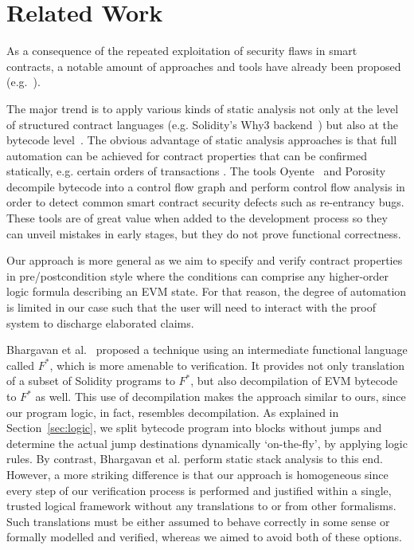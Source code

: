 \documentclass[sigplan,10pt]{acmart}\settopmatter{printfolios=true,printccs=false,printacmref=false}
\begin{document}
\section{Related Work}
\label{sec:rwork}
%
As a consequence of the repeated exploitation of security flaws in smart contracts,
a notable amount of approaches and tools have already been proposed (e.g.~\cite{Bhargavan:2016:FVS:2993600.2993611,securify,Luu_COSH_16}).
 
The major trend is to apply various kinds of static analysis not only at the level of structured contract
languages (e.g. Solidity's Why3 backend~\cite{filliatre2013why3,Reitwiessner_16}) but also at the bytecode level~\cite{Msuiche_17,securify,Luu_COSH_16}. 
%
The obvious advantage of static analysis approaches is that full automation can be achieved for 
contract properties that can be confirmed statically, e.g. certain orders of transactions \cite{securify}.
The tools Oyente~\cite{Luu_COSH_16} and Porosity~\cite{Msuiche_17} decompile
bytecode into a control flow graph and perform control flow analysis in order
to detect common smart contract security defects such as re-entrancy bugs.
These tools are of great value when added to the development process so
they can unveil mistakes in early stages, but they do not prove functional correctness.

Our approach is more general as we aim to specify and verify contract properties in pre/postcondition
style where the conditions can comprise any higher-order logic formula describing an EVM state. 
For that reason, the degree of automation is limited in our case such that the user will need to interact 
with the proof system to discharge elaborated claims.

Bhargavan et al.~\cite{Bhargavan:2016:FVS:2993600.2993611} proposed a technique using an
intermediate functional language called $F^*$,
which is more amenable to verification. 
It provides not only translation of a subset of Solidity programs 
to $F^*$, but also decompilation of EVM bytecode to $F^*$ as well.
This use of decompilation makes
the approach similar to ours, since our program logic, in fact, resembles decompilation.
As explained in Section~\ref{sec:logic}, we split bytecode program into blocks without jumps
and determine the actual jump destinations dynamically `on-the-fly', by applying logic rules.
By contrast, Bhargavan et al. perform static stack analysis to this end.
However, a more striking difference is that our approach is homogeneous since every step of our verification process 
is performed and justified within a single, trusted logical framework without any translations to or from other formalisms.
Such translations must be either assumed to behave correctly in some sense or
formally modelled and verified, whereas we aimed to avoid both of these options.
\end{document}
